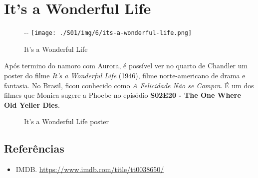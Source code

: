 \hypertarget{its-a-wonderful-life}{%
\section{It's a Wonderful Life}\label{its-a-wonderful-life}}

\begin{figure}[!ht]
  \begin{adjustwidth}{-\oddsidemargin-1in}{-\rightmargin}
    \centering
    \texttt{[image: ./S01/img/6/its-a-wonderful-life.png]}
    \caption{It’s a Wonderful Life\label{fig:it-s-a-wonderful-life}}
  \end{adjustwidth}
\end{figure}

Após termino do namoro com Aurora, é possível ver no quarto de Chandler
um poster do filme \emph{It's a Wonderful Life} (1946), filme
norte-americano de drama e fantasia. No Brasil, ficou conhecido como
\emph{A Felicidade Não se Compra}. É um dos filmes que Monica sugere a
Phoebe no episódio
\textbf{\textcolor{primarycolor}{S02E20 - The One Where Old Yeller Dies}}.

\begin{figure}
  \centering
    \caption{It’s a Wonderful Life poster\label{fig:it-s-a-wonderful-life-poster}}
\end{figure}

\hypertarget{referuxeancias-4}{%
\subsection{Referências}\label{referuxeancias-4}}

\begin{itemize}
\tightlist
\item
  \sloppy IMDB. \url{https://www.imdb.com/title/tt0038650/}
\end{itemize}
